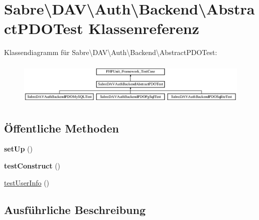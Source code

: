 \hypertarget{class_sabre_1_1_d_a_v_1_1_auth_1_1_backend_1_1_abstract_p_d_o_test}{}\section{Sabre\textbackslash{}D\+AV\textbackslash{}Auth\textbackslash{}Backend\textbackslash{}Abstract\+P\+D\+O\+Test Klassenreferenz}
\label{class_sabre_1_1_d_a_v_1_1_auth_1_1_backend_1_1_abstract_p_d_o_test}
Klassendiagramm für Sabre\textbackslash{}D\+AV\textbackslash{}Auth\textbackslash{}Backend\textbackslash{}Abstract\+P\+D\+O\+Test\+:\begin{figure}[H]
\begin{center}
\leavevmode
\includegraphics[height=2.081784cm]{class_sabre_1_1_d_a_v_1_1_auth_1_1_backend_1_1_abstract_p_d_o_test}
\end{center}
\end{figure}
\subsection*{Öffentliche Methoden}
\begin{DoxyCompactItemize}
\item 
\mbox{\label{class_sabre_1_1_d_a_v_1_1_auth_1_1_backend_1_1_abstract_p_d_o_test_a9fd87830de9a2b6888c92612bc401621}} 
{\bfseries set\+Up} ()
\item 
\mbox{\label{class_sabre_1_1_d_a_v_1_1_auth_1_1_backend_1_1_abstract_p_d_o_test_a6dc177b5a82b5e94aeca183c7ffa3b1a}} 
{\bfseries test\+Construct} ()
\item 
\mbox{\hyperlink{class_sabre_1_1_d_a_v_1_1_auth_1_1_backend_1_1_abstract_p_d_o_test_aee41b3b2893c3ce490d12121279cdec6}{test\+User\+Info}} ()
\end{DoxyCompactItemize}


\subsection{Ausführliche Beschreibung}


